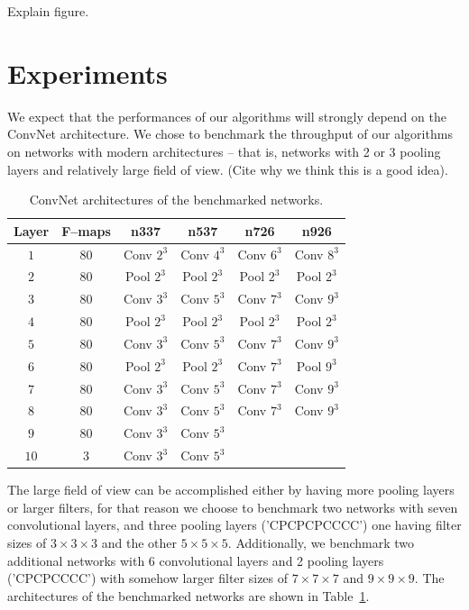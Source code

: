 \documentclass[conference]{IEEEtran}
\begin{document}
  Explain figure.


\section{Experiments}

  We expect that the performances of our algorithms will strongly
  depend on the ConvNet architecture.  We chose to benchmark the
  throughput of our algorithms on networks with modern architectures
  -- that is, networks with 2 or 3 pooling layers and relatively large
  field of view. (Cite why we think this is a good idea).

  \begin{table}
    \centering
    \begin{tabular}{cccccc}
      \toprule
      Layer & F--maps & n337    & n537  &  n726  &  n926 \\
      \midrule
      $1$ & 80 &  Conv $2^3$  & Conv $4^3$  & Conv $6^3$  & Conv $8^3$ \\
      $2$ & 80 &  Pool $2^3$  & Pool $2^3$  & Pool $2^3$  & Pool $2^3$ \\
      $3$ & 80 &  Conv $3^3$  & Conv $5^3$  & Conv $7^3$  & Conv $9^3$ \\
      $4$ & 80 &  Pool $2^3$  & Pool $2^3$  & Pool $2^3$  & Pool $2^3$ \\
      $5$ & 80 &  Conv $3^3$  & Conv $5^3$  & Conv $7^3$  & Conv $9^3$ \\
      $6$ & 80 &  Pool $2^3$  & Pool $2^3$  & Conv $7^3$  & Pool $9^3$ \\
      $7$ & 80 &  Conv $3^3$  & Conv $5^3$  & Conv $7^3$  & Conv $9^3$ \\
      $8$ & 80 &  Conv $3^3$  & Conv $5^3$  & Conv $7^3$  & Conv $9^3$ \\
      $9$ & 80 & Conv $3^3$  & Conv $5^3$  & & \\
      $10$ & 3 & Conv $3^3$  & Conv $5^3$  & & \\
      \bottomrule
    \end{tabular}
    \caption{ConvNet architectures of the benchmarked networks.}
    \label{table:benchmarked_networks}
  \end{table}


  The large field of view can be accomplished either by having more
  pooling layers or larger filters, for that reason we choose to
  benchmark two networks with seven convolutional layers, and three
  pooling layers ('CPCPCPCCCC') one having filter sizes of $3\times 3
  \times 3$ and the other $5\times 5\times 5$.  Additionally, we
  benchmark two additional networks with 6 convolutional layers and 2
  pooling layers ('CPCPCCCC') with somehow larger filter sizes of $7
  \times 7 \times 7$ and $9 \times 9 \times 9$.  The architectures of
  the benchmarked networks are shown in
  Table~\ref{table:benchmarked_networks}.
\end{document}
